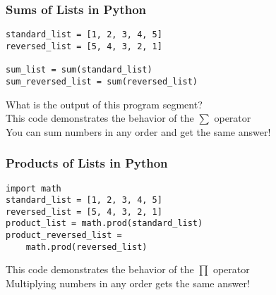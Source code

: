 \documentclass[14pt,aspectratio=169]{beamer}
\begin{document}
%
\begin{frame}[fragile]
  \frametitle{Sums of Lists in Python}
  \begin{minipage}{6in}
    \vspace*{.25in}
    \begin{verbatim}
standard_list = [1, 2, 3, 4, 5]
reversed_list = [5, 4, 3, 2, 1]

sum_list = sum(standard_list)
sum_reversed_list = sum(reversed_list)
    \end{verbatim}
  \end{minipage}
  \vspace*{.05in}
  \begin{center}
    \normalsize \noindent What is the output of this program segment? \\
    \normalsize \noindent This code demonstrates the behavior of the $\sum$
    operator \\
    \normalsize \noindent You can sum numbers in any order and get the same
    answer! \\
  \end{center}
\end{frame}

%
\begin{frame}[fragile]
  \frametitle{Products of Lists in Python}
  \begin{minipage}{6in}
    \vspace*{.25in}
    \begin{verbatim}
import math
standard_list = [1, 2, 3, 4, 5]
reversed_list = [5, 4, 3, 2, 1]
product_list = math.prod(standard_list)
product_reversed_list =
    math.prod(reversed_list)
    \end{verbatim}
  \end{minipage}
  \vspace*{.05in}
  \begin{center}
    \normalsize \noindent This code demonstrates the behavior of the $\prod$
    operator \\
    \normalsize \noindent Multiplying numbers in any order gets the same
    answer! \\
  \end{center}
\end{frame}
\end{document}
